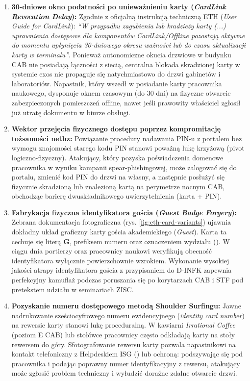\begin{enumerate}
    \item \textbf{30-dniowe okno podatności po unieważnieniu karty (\textit{CardLink Revocation Delay}):} Zgodnie z oficjalną instrukcją techniczną ETH (\textit{User Guide for CardLink}): \textit{\enquote{W przypadku zagubienia lub kradzieży karty (...) uprawnienia dostępowe dla komponentów CardLink/Offline pozostają aktywne do momentu upłynięcia 30-dniowego okresu ważności lub do czasu aktualizacji karty w terminalu}}. Ponieważ autonomiczne okucia drzwiowe w budynku CAB nie posiadają łączności z siecią, centralna blokada skradzionej karty w systemie exos nie propaguje się natychmiastowo do drzwi gabinetów i laboratoriów. Napastnik, który wszedł w posiadanie karty pracownika naukowego, dysponuje oknem czasowym (do 30 dni) na fizyczne otwarcie zabezpieczonych pomieszczeń offline, nawet jeśli prawowity właściciel zgłosił już utratę dokumentu w biurze obsługi.
    \item \textbf{Wektor przejęcia fizycznego dostępu poprzez kompromitację tożsamości nethz:} Powiązanie procedury nadawania PIN-u z portalem  bez wymogu znajomości starego kodu PIN stanowi poważną lukę krzyżową (pivot logiczno-fizyczny). Atakujący, który pozyska poświadczenia domenowe  pracownika w wyniku kampanii spear-phishingowej, może zalogować się do portalu, zmienić kod PIN do drzwi na własny, a następnie posłużyć się fizycznie skradzioną lub znalezioną kartą na perymetrze nocnym CAB, obchodząc barierę dwuskładnikowego uwierzytelnienia (karta + PIN).
    \item \textbf{Fabrykacja fizyczna identyfikatora gościa (\textit{Guest Badge Forgery}):} Zebrana dokumentacja fotograficzna (rys. \ref{fig:eth-card-variants}) ujawnia dokładny układ graficzny karty gościa akademickiego (\textit{Guest}). Karta ta cechuje się literą \textbf{G}, prefiksem numeru  oraz oznaczeniem wydziału (). W ciągu dnia portierzy oraz pracownicy naukowi weryfikują obecność identyfikatora wyłącznie powierzchownie wzrokiem. Wykonanie wysokiej jakości atrapy identyfikatora gościa z przypisaniem do D-INFK zapewnia perfekcyjny kamuflaż podczas poruszania się po korytarzach CAB i STF pod pretekstem udziału w seminariach ZISC.
    \item \textbf{Pozyskanie numeru dostępowego metodą Shoulder Surfingu:} Jawne nadrukowanie sześciocyfrowego numeru ewidencyjnego (\textit{identity card number}) na rewersie karty stanowi lukę proceduralną. W kawiarni \textit{Irrational Coffee} (poziom E CAB) lub stołówce pracownicy często odkładają karty na stoły rewersem do góry. Sfotografowanie rewersu karty pozwala napastnikowi na kontakt telefoniczny z Helpdeskiem ISG () lub ochroną: podszywając się pod pracownika i podając poprawny numer identyfikacyjny z rewersu, atakujący może zgłosić problem techniczny i wyłudzić doraźne zdalne otwarcie drzwi.

\end{enumerate}
